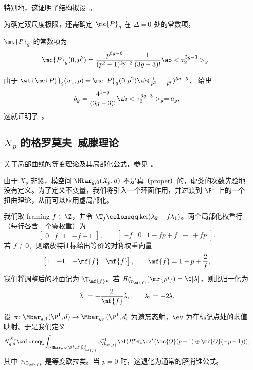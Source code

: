 特别地，这证明了结构拟设~。

为确定双尺度极限，还需确定 \(\mc{P}_g\) 在 \(\Delta = 0\) 处的常数项。

\begin{thm}%
\label{thm:local P1 constant term}
    \(\mc{P}_g\) 的常数项为
    \[ \mc{P}_g(0,p^2) = \frac{p^{6g-6}}{(p^2-1)^{2g-2}}\frac{1}{(3g-3)!}\ab<\tau_2^{3g-3}>_g. \]
\end{thm}

由于 \(\wt{\mc{P}}_g(w_c,p) = \mc{P}_g(0,p^2)\ab(\frac{1}{p^2}-\frac{1}{p^4})^{5g-5}\)， 给出
\[ b_g = \frac{4^{1-g}}{(3g-3)!}\ab<\tau_2^{3g-3}>_g = a_g, \]
这就证明了~。

\subsection{\(X_p\) 的格罗莫夫–威滕理论}%
\label{sub:Gromov-Witten theory of Xp}

关于局部曲线的等变理论及其局部化公式，参见~\cite{BryanPandharipande2008}。

由于 \(X_p\) 非紧，模空间 \(\Mbar_{g,0}(X_p,d)\) 不是真（proper）的，虚类的次数先验地没有定义。为了定义不变量，我们将引入一个环面作用，并过渡到 \(\P^1\) 上的一个扭曲理论，从而可以应用虚局部化。

我们取 framing \(f \in \Z\)，并令 \(\T_f \coloneqq \ker(\lambda_2 - f\lambda_1)\)。两个局部化权重行（每行各含一个零权重）为
\[ \begin{bmatrix} 0 & f & 1 & -f-1 \end{bmatrix}, \qquad \begin{bmatrix} -f & 0 & 1-fp+f & -1+fp \end{bmatrix}. \]
若 \(f \neq 0\)，则缩放特征标给出等价的对称权重向量
\[ \begin{bmatrix} 1 & -1 & -\mf{f} & \mf{f} \end{bmatrix}, \qquad \mf{f} = 1-p+\frac{2}{f}, \]
我们将调整后的环面记为 \(\T_{\mf{f}}\)。若 \(H^*_{\T_{\mf{f}}}(\mr{pt}) = \C[\lambda]\)，则此归一化为
\[ \lambda_1 = -\frac{2}{\mf{f}}\lambda, \qquad \lambda_2 = -2\lambda. \]

设 \(\pi \colon \Mbar_{g,1}(\P^1,d) \to \Mbar_{g,0}(\P^1,d)\) 为遗忘态射，\(\ev\) 为在标记点处的求值映射。于是我们定义
\[ N^{X_p}_{g,d} \coloneqq \int_{[\Mbar_{g,0}(\P^1,d)]^{\vir}_{\T_{\mf{f}}}} e_{\T_{\mf{f}}}^{-1}\ab(R^{\bullet}\pi_* \ev^*(\mc{O}(p-1)\oplus\mc{O}(-p-1))), \]
其中 \(e_{\T_{\mf{f}}}\) 是等变欧拉类。当 \(p=0\) 时，这退化为通常的解消锥公式。

